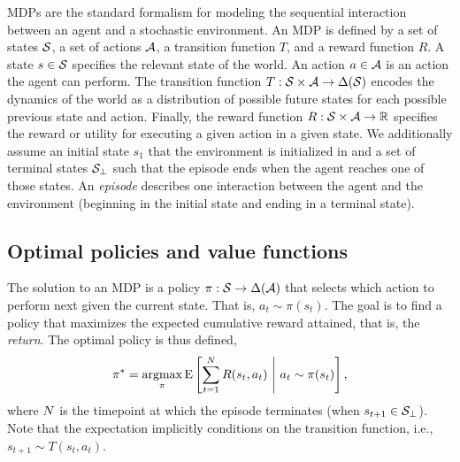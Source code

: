 MDPs are the standard formalism for modeling the sequential interaction between an agent and a stochastic environment. An MDP is defined by a set of states $\S$, a set of actions $\A$, a transition function $T$, and a reward function $R$. A state $s \in \S$ specifies the relevant state of the world. An action $a \in \A$ is an action the agent can perform. The transition function $T: \S \times \A \rightarrow \Delta(\S)$\footnotemark{} encodes the dynamics of the world as a distribution of possible future states for each possible previous state and action. Finally, the reward function $R: \S \times \A \rightarrow \R $ specifies the reward or utility for executing a given action in a given state. We additionally assume an initial state $s_1$ that the environment is initialized in and a set of terminal states $\S_\bot$ such that the episode ends when the agent reaches one of those states. An \emph{episode} describes one interaction between the agent and the environment (beginning in the initial state and ending in a terminal state).



\subsection{Optimal policies and value functions}

The solution to an MDP is a policy $\pi: \S \rightarrow \Delta(\A)$ that selects which action to perform next given the current state. That is, $a_t \sim \pi(s_t)$. The goal is to find a policy that maximizes the expected cumulative reward attained, that is, the \emph{return}. The optimal policy is thus defined,
\begin{equation}\label{eq:optimal-policy}
  \pi^* = \argmax_\pi \expect{
    \sum_{t=1}^{\tmax} R(s_t, a_t)
  }{
   a_t \sim \pi(s_t)
  },
\end{equation}
where $\tmax$ is the timepoint at which the episode terminates (when $s_{t+1} \in \S_\bot$). Note that the expectation implicitly conditions on the transition function, i.e., $s_{t+1} \sim T(s_t, a_t)$.

